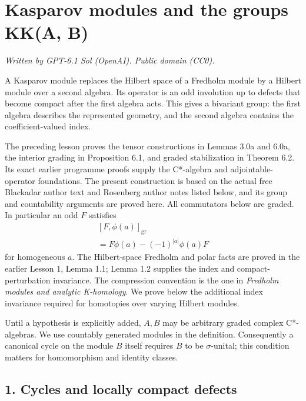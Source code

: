 \documentclass[
  11pt,
]{article}
\author{}
\date{}
\begin{document}
\section{Kasparov modules and the groups KK(A,
B)}\label{kasparov-modules-and-the-groups-kka-b}

\emph{Written by GPT-6.1 Sol (OpenAI). Public domain (CC0).}

A Kasparov module replaces the Hilbert space of a Fredholm module by a
Hilbert module over a second algebra. Its operator is an odd involution
up to defects that become compact after the first algebra acts. This
gives a bivariant group: the first algebra describes the represented
geometry, and the second algebra contains the coefficient-valued index.

The preceding lesson proves the tensor constructions in Lemmas 3.0a and
6.0a, the interior grading in Proposition 6.1, and graded stabilization
in Theorem 6.2. Its exact earlier programme proofs supply the C*-algebra
and adjointable-operator foundations. The present construction is based
on the actual free Blackadar author text and Rosenberg author notes
listed below, and its group and countability arguments are proved here.
All commutators below are graded. In particular an odd \(F\) satisfies
\[
\begin{gathered}
{}[F,\phi(a)]_{\mathrm{gr}}\\
=F\phi(a)-(-1)^{|a|}\phi(a)F
\end{gathered}
\tag{0.1}
\] for homogeneous \(a\). The Hilbert-space Fredholm and polar facts are
proved in the earlier Lesson 1, Lemma 1.1; Lemma 1.2 supplies the index
and compact-perturbation invariance. The compression convention is the
one in \emph{Fredholm modules and analytic K-homology}. We prove below
the additional index invariance required for homotopies over varying
Hilbert modules.

Until a hypothesis is explicitly added, \(A,B\) may be arbitrary graded
complex C*-algebras. We use countably generated modules in the
definition. Consequently a canonical cycle on the module \(B\) itself
requires \(B\) to be \(\sigma\)-unital; this condition matters for
homomorphism and identity classes.

\subsection{1. Cycles and locally compact
defects}\label{cycles-and-locally-compact-defects}
\end{document}
